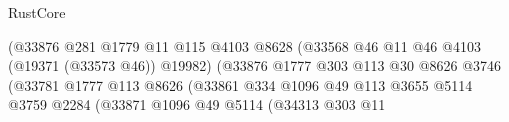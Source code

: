 \begin{lexlean}{RustCore}
\begin{coremodule}
                                                    (@33876
                                                      @281
                                                      @1779
                                                      @11
                                                      @115
                                                      @4103
                                                      @8628
                                                      (@33568
                                                        @46
                                                        @11
                                                        @46
                                                        @4103
                                                        (@19371 (@33573 @46))
                                                        @19982)
                                                      (@33876
                                                        @1777
                                                        @303
                                                        @113
                                                        @30
                                                        @8626
                                                        @3746
                                                        (@33781
                                                          @1777
                                                          @113
                                                          @8626
                                                          (@33861
                                                            @334
                                                            @1096
                                                            @49
                                                            @113
                                                            @3655
                                                            @5114
                                                            @3759
                                                            @2284
                                                            (@33871
                                                              @1096
                                                              @49
                                                              @5114
                                                              (@34313
                                                                @303
                                                                @11

\end{coremodule}
\end{lexlean}
